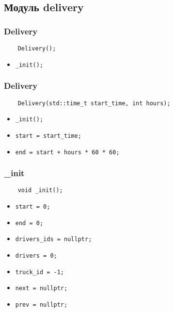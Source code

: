 \subsection{Модуль delivery}

\subsubsection{Delivery}

\begin{lstlisting}
    Delivery();
\end{lstlisting}

\begin{itemize}
    \item \verb|_init();|
\end{itemize}

\subsubsection{Delivery}

\begin{lstlisting}
    Delivery(std::time_t start_time, int hours);
\end{lstlisting}

\begin{itemize}
    \item \verb|_init();|
    \item \verb|start = start_time;|
    \item \verb|end = start + hours * 60 * 60;|
\end{itemize}

\subsubsection{\_init}

\begin{lstlisting}
    void _init();
\end{lstlisting}

\begin{itemize}
    \item \verb|start = 0;|
    \item \verb|end = 0;|
    \item \verb|drivers_ids = nullptr;|
    \item \verb|drivers = 0;|
    \item \verb|truck_id = -1; |
    \item \verb|next = nullptr;|
    \item \verb|prev = nullptr;|
\end{itemize}

